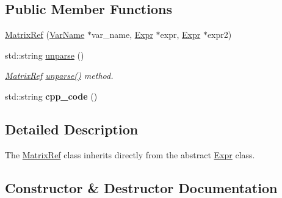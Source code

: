 \subsection*{Public Member Functions}
\begin{DoxyCompactItemize}
\item 
\hyperlink{classfcal_1_1ast_1_1MatrixRef_aaef1a2bd3e934bf6b8c2a18321576f98}{Matrix\+Ref} (\hyperlink{classfcal_1_1ast_1_1VarName}{Var\+Name} $\ast$var\+\_\+name, \hyperlink{classfcal_1_1ast_1_1Expr}{Expr} $\ast$expr, \hyperlink{classfcal_1_1ast_1_1Expr}{Expr} $\ast$expr2)
\item 
std\+::string \hyperlink{classfcal_1_1ast_1_1MatrixRef_a464c4f47c039d24a14960d3d8df00051}{unparse} ()
\begin{DoxyCompactList}\small\item\em \hyperlink{classfcal_1_1ast_1_1MatrixRef}{Matrix\+Ref} \hyperlink{classfcal_1_1ast_1_1MatrixRef_a464c4f47c039d24a14960d3d8df00051}{unparse()} method. \end{DoxyCompactList}\item 
std\+::string {\bfseries cpp\+\_\+code} ()\hypertarget{classfcal_1_1ast_1_1MatrixRef_a90e589782dff7bbfd24ee19d8f6507a2}{}\label{classfcal_1_1ast_1_1MatrixRef_a90e589782dff7bbfd24ee19d8f6507a2}

\end{DoxyCompactItemize}


\subsection{Detailed Description}
The \hyperlink{classfcal_1_1ast_1_1MatrixRef}{Matrix\+Ref} class inherits directly from the abstract \hyperlink{classfcal_1_1ast_1_1Expr}{Expr} class. 

\subsection{Constructor \& Destructor Documentation}
